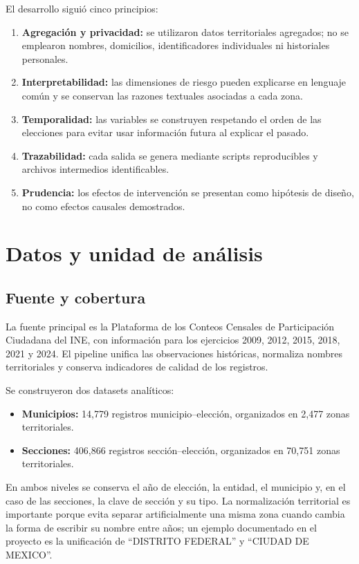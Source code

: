 \documentclass[11pt,a4paper]{article}
\begin{document}
El desarrollo siguió cinco principios:
\begin{enumerate}
    \item \textbf{Agregación y privacidad:} se utilizaron datos territoriales agregados; no se emplearon nombres, domicilios, identificadores individuales ni historiales personales.
    \item \textbf{Interpretabilidad:} las dimensiones de riesgo pueden explicarse en lenguaje común y se conservan las razones textuales asociadas a cada zona.
    \item \textbf{Temporalidad:} las variables se construyen respetando el orden de las elecciones para evitar usar información futura al explicar el pasado.
    \item \textbf{Trazabilidad:} cada salida se genera mediante scripts reproducibles y archivos intermedios identificables.
    \item \textbf{Prudencia:} los efectos de intervención se presentan como hipótesis de diseño, no como efectos causales demostrados.
\end{enumerate}

\section{Datos y unidad de análisis}

\subsection{Fuente y cobertura}

La fuente principal es la Plataforma de los Conteos Censales de Participación Ciudadana del INE, con información para los ejercicios 2009, 2012, 2015, 2018, 2021 y 2024. El pipeline unifica las observaciones históricas, normaliza nombres territoriales y conserva indicadores de calidad de los registros.

Se construyeron dos datasets analíticos:
\begin{itemize}
    \item \textbf{Municipios:} 14,779 registros municipio--elección, organizados en 2,477 zonas territoriales.
    \item \textbf{Secciones:} 406,866 registros sección--elección, organizados en 70,751 zonas territoriales.
\end{itemize}

En ambos niveles se conserva el año de elección, la entidad, el municipio y, en el caso de las secciones, la clave de sección y su tipo. La normalización territorial es importante porque evita separar artificialmente una misma zona cuando cambia la forma de escribir su nombre entre años; un ejemplo documentado en el proyecto es la unificación de ``DISTRITO FEDERAL'' y ``CIUDAD DE MEXICO''.
\end{document}
